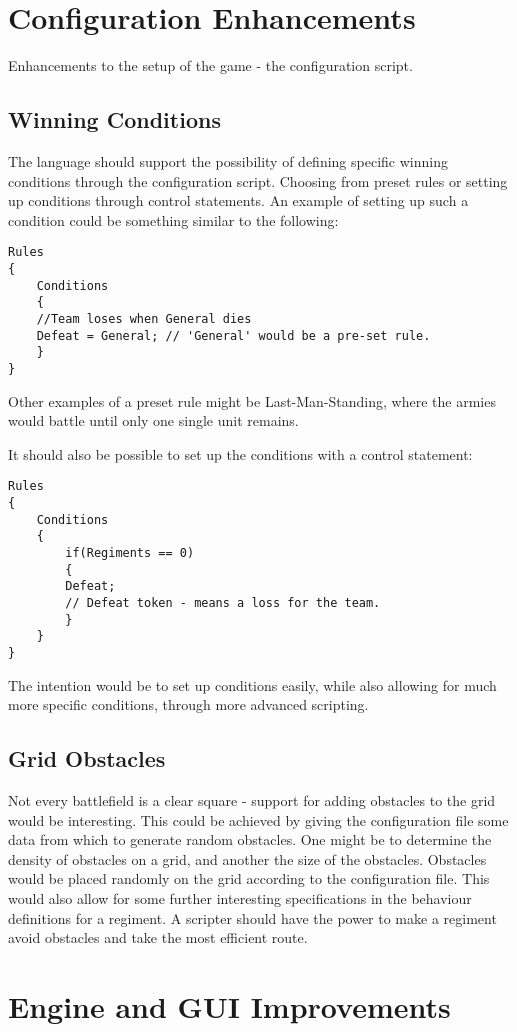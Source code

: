 \section{Configuration Enhancements}
Enhancements to the setup of the game - the configuration script.
\subsection{Winning Conditions}
The language should support the possibility of defining specific winning conditions through the configuration script. Choosing from preset rules or setting up conditions through control statements.
An example of setting up such a condition could be something similar to the following:

\begin{lstlisting}
Rules
{
	Conditions
	{
	//Team loses when General dies
	Defeat = General; // 'General' would be a pre-set rule.
	}
}

\end{lstlisting}
Other examples of a preset rule might be Last-Man-Standing, where the armies would battle until only one single unit remains.

It should also be possible to set up the conditions with a control statement:
\begin{lstlisting}
Rules
{
	Conditions
	{
		if(Regiments == 0)
		{
		Defeat; 
		// Defeat token - means a loss for the team.
		}
	}
}

\end{lstlisting}
The intention would be to set up conditions easily, while also allowing for much more specific conditions, through more advanced scripting.
\subsection{Grid Obstacles}
Not every battlefield is a clear square - support for adding obstacles to the grid would be interesting. This could be achieved by giving the configuration file some data from which to generate random obstacles. One might be to determine the density of obstacles on a grid, and another the size of the obstacles. Obstacles would be placed randomly on the grid according to the configuration file. This would also allow for some further interesting specifications in the behaviour definitions for a regiment. A scripter should have the power to make a regiment avoid obstacles and take the most efficient route.
\section{Engine and GUI Improvements}
